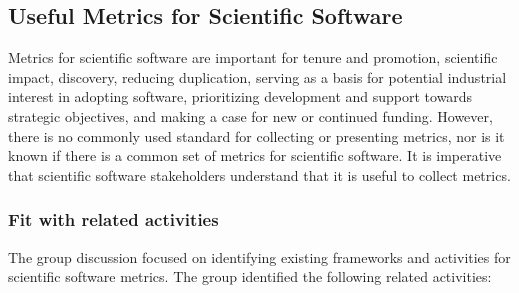 \subsection{Useful Metrics for Scientific Software}
\label{sec:software-metrics}


Metrics for scientific software are important for tenure and promotion,
scientific impact, discovery, reducing duplication, serving as a basis for
potential industrial interest in adopting software, prioritizing development and
support towards strategic objectives, and making a case for new or continued
funding. However, there is no commonly used standard for collecting or
presenting metrics, nor is it known if there is a common set of metrics for
scientific software. It is imperative that scientific software stakeholders
understand that it is useful to collect metrics.

\subsubsection{Fit with related activities}

The group discussion focused on identifying existing frameworks and activities
for scientific software metrics. The group identified the following related
activities:


